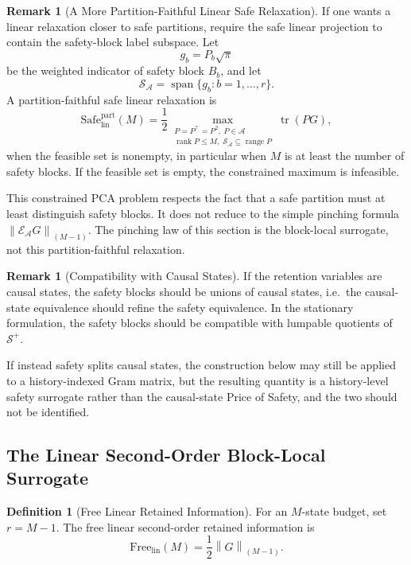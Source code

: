 \documentclass[12pt]{article}
\theoremstyle{definition}
\newtheorem{definition}[theorem]{Definition}
\newtheorem{remark}[theorem]{Remark}
\DeclareMathOperator{\rank}{rank}
\DeclareMathOperator{\tr}{tr}
\newcommand{\EA}{\mathcal E_{\mathcal A}}
\newcommand{\KyF}[2]{\left\|#1\right\|_{(#2)}}
\newcommand{\Splus}{\mathcal S^{+}}
\begin{document}
\begin{remark}[A More Partition-Faithful Linear Safe Relaxation]
\label{rem:partition-faithful}
If one wants a linear relaxation closer to safe partitions, require the safe
linear projection to contain the safety-block label subspace.  Let
\[
g_b=P_b\sqrt{\pi}
\]
be the weighted indicator of safety block $B_b$, and let
\[
\mathcal S_{\mathcal A}
=
\operatorname{span}\{g_b:b=1,\dots,r\}.
\]
A partition-faithful safe linear relaxation is
\[
\mathrm{Safe}_{\mathrm{lin}}^{\mathrm{part}}(M)
=
\frac12
\max_{\substack{
P=P^\top=P^2,\;P\in\mathcal A\\
\rank P\le M,\;
\mathcal S_{\mathcal A}\subseteq\operatorname{range}P
}}
\tr(PG),
\]
when the feasible set is nonempty, in particular when $M$ is at least the
number of safety blocks.  If the feasible set is empty, the constrained
maximum is infeasible.

This constrained PCA problem respects the fact that a safe partition must at
least distinguish safety blocks.  It does not reduce to the simple pinching
formula $\KyF{\EA G}{M-1}$.  The pinching law of this section is the
block-local surrogate, not this partition-faithful relaxation.
\end{remark}

\begin{remark}[Compatibility with Causal States]
\label{rem:pos-causal-compatibility}
If the retention variables are causal states, the safety blocks should be
unions of causal states, i.e.\ the causal-state equivalence should refine the
safety equivalence.  In the stationary formulation, the safety blocks should
be compatible with lumpable quotients of $\Splus$.

If instead safety splits causal states, the construction below may still be
applied to a history-indexed Gram matrix, but the resulting quantity is a
history-level safety surrogate rather than the causal-state Price of Safety,
and the two should not be identified.
\end{remark}

\subsection{The Linear Second-Order Block-Local Surrogate}
\label{subsec:pos-surrogate}

\begin{definition}[Free Linear Retained Information]
\label{def:free-linear}
For an $M$-state budget, set $r=M-1$.  The free linear second-order retained
information is
\[
\mathrm{Free}_{\mathrm{lin}}(M)
=
\frac12
\KyF{G}{M-1}.
\]
\end{definition}
\end{document}

